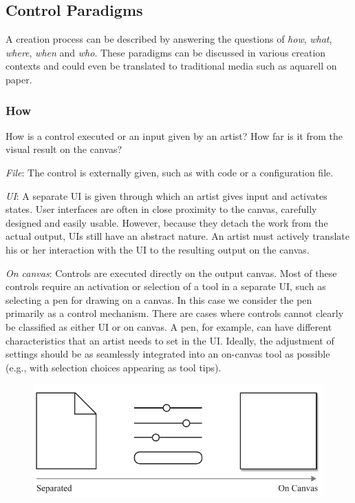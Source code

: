 \subsection{Control Paradigms}

A creation process can be described by answering the questions of \textit{how}, \textit{what}, \textit{where}, \textit{when} and \textit{who}. These paradigms can be discussed in various creation contexts and could even be translated to traditional media such as aquarell on paper.

\subsubsection{How}

How is a control executed or an input given by an artist? How far is it from the visual result on the canvas?


\textit{File}: The control is externally given, such as with code or a configuration file.

\textit{UI}: A separate UI is given through which an artist gives input and activates states. User interfaces are often in close proximity to the canvas, carefully designed and easily usable. However, because they detach the work from the actual output, UIs still have an abstract nature. An artist must actively translate his or her interaction with the UI to the resulting output on the canvas.

\textit{On canvas}: Controls are executed directly on the output canvas. Most of these controls require an activation or selection of a tool in a separate UI, such as selecting a pen for drawing on a canvas. In this case we consider the pen primarily as a control mechanism. There are cases where controls cannot clearly be classified as either UI or on canvas. A pen, for example, can have different characteristics that an artist needs to set in the UI. Ideally, the adjustment of settings should be as seamlessly integrated into an on-canvas tool as possible (e.g., with selection choices appearing as tool tips).

\begin{figure}[H]
    \centering
        \includegraphics[width=\controlParamsFigWidth\linewidth]{figures/control_paradigms/how.pdf}
\end{figure}


